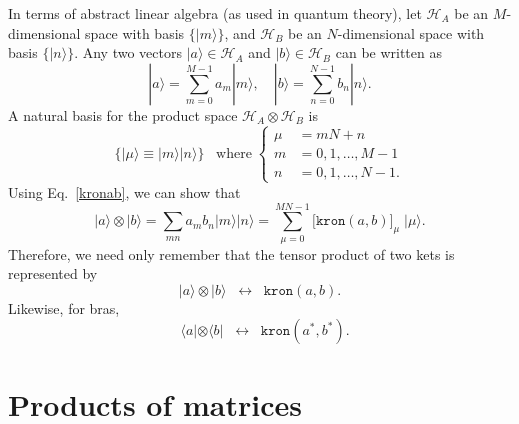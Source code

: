 \documentclass[prx,12pt]{revtex4-2}
\begin{document}
In terms of abstract linear algebra (as used in quantum theory), let
$\mathscr{H}_A$ be an $M$-dimensional space with basis
$\{|m\rangle\}$, and $\mathscr{H}_B$ be an $N$-dimensional space with
basis $\{|n\rangle\}$.  Any two vectors $|a\rangle \in \mathscr{H}_A$
and $|b\rangle \in \mathscr{H}_B$ can be written as
\begin{equation}
  |a\rangle = \sum_{m=0}^{M-1} a_m |m\rangle, \quad |b\rangle = \sum_{n=0}^{N-1} b_n |n\rangle.
\end{equation}
A natural basis for the product space $\mathscr{H}_A\otimes
\mathscr{H}_B$ is
\begin{equation}
  \Big\{|\mu\rangle \equiv |m\rangle |n\rangle\Big\}
  \;\;\;\mathrm{where} \;
  \begin{cases}
    \mu\!\!\!\! &= mN+n \\
    m \!\!\!\!&= 0,1,\dots,M-1 \\
    n \!\!\!\!&= 0,1, \dots, N-1.
  \end{cases}
  \label{mubasis}
\end{equation}
Using Eq.~\eqref{kronab}, we can show that
\begin{equation}
  |a\rangle\otimes|b\rangle
  = \sum_{mn} a_m b_n |m\rangle |n\rangle
  = \sum_{\mu=0}^{MN-1} \big[\texttt{kron}(a,b)\big]_\mu \; |\mu\rangle.
\end{equation}
Therefore, we need only remember that the tensor product of two
kets is represented by
\begin{equation}
  |a\rangle\otimes|b\rangle \;\;\leftrightarrow\;\;
  \texttt{kron}(a,b).
  \label{result1}
\end{equation}
Likewise, for bras,
\begin{equation}
  \;\;\,\langle a| \otimes \langle b| \;\;\leftrightarrow\;\;
  \texttt{kron}(a^*,b^*).
  \label{result1a}
\end{equation}

\section{Products of matrices}
\end{document}
